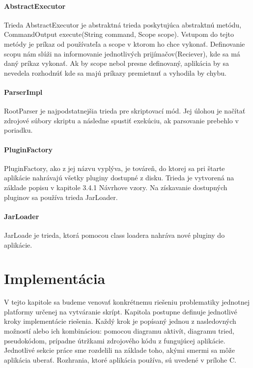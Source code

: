 {\paragraph{AbstractExecutor}
Trieda AbstractExecutor je abstraktná trieda poskytujúca abstraktnú metódu,  CommandOutput execute(String command, Scope scope). Vstupom do tejto metódy je príkaz od používateľa a scope v ktorom ho chce vykonať. Definovanie scopu nám slúži na informovanie jednotlivých prijímačov(Reciever), kde sa má daný príkaz vykonať. Ak by scope nebol presne definovaný, aplikácia by sa nevedela rozhodnúť kde sa majú príkazy premietnuť a vyhodila by chybu.
\paragraph{ParserImpl}
RootParser je najpodstatnejšia trieda pre skriptovací mód. Jej úlohou je načítať zdrojové súbory skriptu a následne spustiť exekúciu, ak parsovanie prebehlo v poriadku.
\paragraph{PluginFactory}
PluginFactory, ako z jej názvu vyplýva, je továreň, do ktorej sa pri štarte aplikácie nahrávajú všetky pluginy dostupné z disku. Trieda je vytvorená na základe popisu v kapitole 3.4.1 Návrhove vzory. Na získavanie dostupných pluginov sa používa trieda JarLoader. 
\paragraph{JarLoader}
JarLoade je trieda, ktorá pomocou class loadera nahráva nové pluginy do aplikácie.
\section{Implementácia}
\indent V tejto kapitole sa budeme venovať konkrétnemu riešeniu problematiky jednotnej platformy určenej na vytváranie skrípt. Kapitola postupne definuje jednotlivé kroky implementácie riešenia. Každý krok je popísaný jednou z nasledovných možností alebo ich kombináciou: pomocou diagramu aktivít, diagramu tried, pseudokódom, prípadne útržkami zdrojového kódu z fungujúcej aplikácie. Jednotlivé sekcie práce sme rozdelili na základe toho, akými smermi sa môže aplikácia uberať. Rozhrania, ktoré aplikácia používa, sú uvedené v prílohe C.
}
